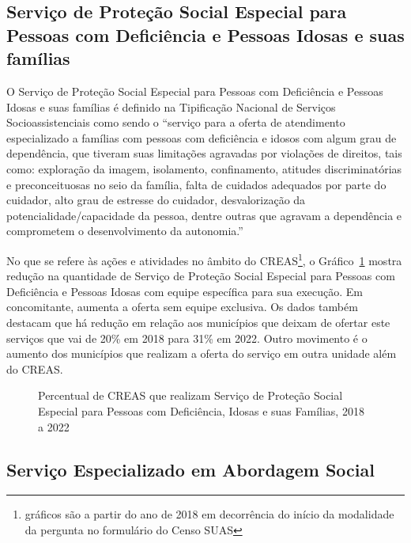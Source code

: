 \documentclass[
  letterpaper,
  DIV=11,
  numbers=noendperiod]{scrreprt}
\begin{document}
\subsection{Serviço de Proteção Social Especial para Pessoas com
Deficiência e Pessoas Idosas e suas
famílias}\label{serviuxe7o-de-proteuxe7uxe3o-social-especial-para-pessoas-com-deficiuxeancia-e-pessoas-idosas-e-suas-famuxedlias}

O Serviço de Proteção Social Especial para Pessoas com Deficiência e
Pessoas Idosas e suas famílias é definido na Tipificação Nacional de
Serviços Socioassistenciais como sendo o ``serviço para a oferta de
atendimento especializado a famílias com pessoas com deficiência e
idosos com algum grau de dependência, que tiveram suas limitações
agravadas por violações de direitos, tais como: exploração da imagem,
isolamento, confinamento, atitudes discriminatórias e preconceituosas no
seio da família, falta de cuidados adequados por parte do cuidador, alto
grau de estresse do cuidador, desvalorização da
potencialidade/capacidade da pessoa, dentre outras que agravam a
dependência e comprometem o desenvolvimento da autonomia.''

No que se refere às ações e atividades no âmbito do CREAS\footnote{gráficos
  são a partir do ano de 2018 em decorrência do início da modalidade da
  pergunta no formulário do Censo SUAS}, o
Gráfico~\ref{fig-creas-pse-domicilio} mostra redução na quantidade de
Serviço de Proteção Social Especial para Pessoas com Deficiência e
Pessoas Idosas com equipe específica para sua execução. Em concomitante,
aumenta a oferta sem equipe exclusiva. Os dados também destacam que há
redução em relação aos municípios que deixam de ofertar este serviços
que vai de 20\% em 2018 para 31\% em 2022. Outro movimento é o aumento
dos municípios que realizam a oferta do serviço em outra unidade além do
CREAS.

\begin{figure}


\caption{\label{fig-creas-pse-domicilio}Percentual de CREAS que realizam
Serviço de Proteção Social Especial para Pessoas com Deficiência, Idosas
e suas Famílias, 2018 a 2022}

\end{figure}%

\subsection{Serviço Especializado em Abordagem
Social}\label{serviuxe7o-especializado-em-abordagem-social}
\end{document}
